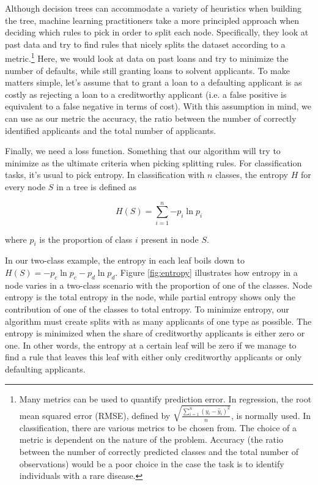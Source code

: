 Although decision trees can accommodate a variety of heuristics when building the tree, machine learning practitioners take a more principled approach when deciding which rules to pick in order to split each node. Specifically, they look at past data and try to find rules that nicely splits the dataset according to a metric.\footnote{ Many metrics can be used to quantify prediction error. In regression, the root mean squared error (RMSE), defined by $\sqrt{\frac{\sum_{i = 1}^n ({y_i - \hat{y}_i})^2  }{n}}$, is normally used. In classification, there are various metrics to be chosen from. The choice of a metric is dependent on the nature of the problem. Accuracy (the ratio between the number of correctly predicted classes and the total number of observations) would be a poor choice in the case the task is to identify individuals with a rare disease.} Here, we would look at data on past loans and try to minimize the number of defaults, while still granting loans to solvent applicants. To make matters simple, let's assume that to grant a loan to a defaulting applicant is as costly as rejecting a loan to a creditworthy applicant (i.e. a false positive is equivalent to a false negative in terms of cost). With this assumption in mind, we can use as our metric the accuracy, the ratio between the number of correctly identified applicants and the total number of applicants.

Finally, we need a loss function. Something that our algorithm will try to minimize as the ultimate criteria when picking splitting rules. For classification tasks, it's usual to pick entropy. In classification with $n$ classes, the entropy $H$ for every node $S$ in a tree is defined as

\begin{equation}
    H(S) = \sum_{i = 1}^n{-p_i \ln p_i}
\end{equation}

where $p_i$ is the proportion of class $i$ present in node $S$.

In our two-class example, the entropy in each leaf boils down to $H(S) = - p_{c}  \ln p_{c} - p_{d} \ln p_{d}$. Figure \ref{fig:entropy} illustrates how entropy in a node varies in a two-class scenario with the proportion of one of the classes. Node entropy is the total entropy in the node, while partial entropy shows only the contribution of one of the classes to total entropy. To minimize entropy, our algorithm must create splits with as many applicants of one type as possible. The entropy is minimized when the share of creditworthy applicants is either zero or one. In other words, the entropy at a certain leaf will be zero if we manage to find a rule that leaves this leaf with either only creditworthy applicants or only defaulting applicants.


